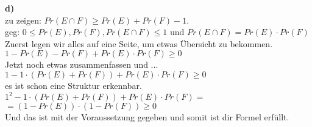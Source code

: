 \documentclass[a4paper]{scrartcl}
\begin{document}
\begin{flushleft}
		\textbf{d)}\\
		zu zeigen: $Pr(E\cap F) \geq Pr(E)+Pr(F)-1$.\\
		geg: $0\leq Pr(E),Pr(F),Pr(E\cap F)\leq 1$ und $Pr(E\cap F)=Pr(E)\cdot Pr(F)$\\[1em]
		Zuerst legen wir alles auf eine Seite, um etwas Übersicht zu bekommen.\\
		$1 - Pr(E) - Pr(F) + Pr(E)\cdot Pr(F) \geq 0$\\
		Jetzt noch etwas zusammenfassen und ...\\
		$1 - 1\cdot(Pr(E) + Pr(F)) + Pr(E)\cdot Pr(F) \geq 0$\\
		es ist schon eine Struktur erkennbar.\\
		$1^2 - 1\cdot(Pr(E) + Pr(F)) + Pr(E)\cdot Pr(F) =$\\
		$= (1-Pr(E))\cdot(1-Pr(F))\geq 0$\\[1em]
		Und das ist mit der Voraussetzung gegeben und somit ist dir Formel erfüllt.\\[1em]
	\end{flushleft}
\end{document}
